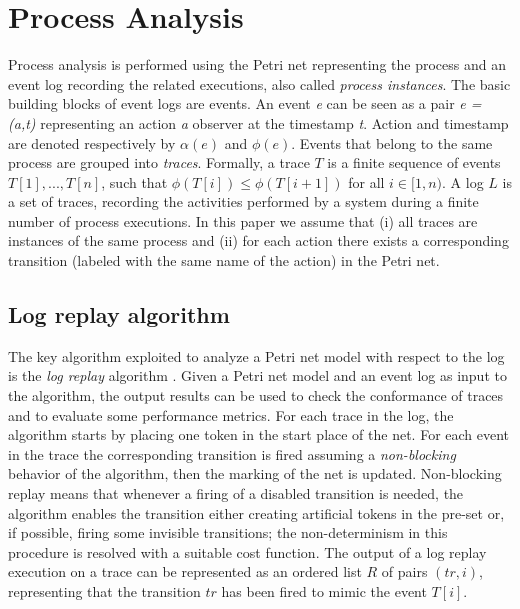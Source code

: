 \documentclass{llncs}
\begin{document}
\section{Process Analysis}\label{Background}

Process analysis is performed using the Petri net representing the
process and an event log recording the related executions, also called
\emph{process instances}. The basic building blocks of event logs are
events. An event {\itshape e} can be seen as a pair {\itshape e =
  (a,t) } representing an action {\itshape a } observer at the
timestamp {\itshape t}. Action and timestamp are denoted respectively
by $\alpha(e)$ and $\phi(e)$. Events that belong to the same process
are grouped into {\itshape traces}. Formally, a trace $T$ is a finite
sequence of events $T[1],..., T[n]$, such that $\phi(T[i]) \leq
\phi(T[i+1])$ for all  $i \in [1,n)$. A log $L$ is a set of traces,
recording the activities performed by a system during a finite number
of process executions. In this paper we assume that
(i) all traces are instances of the same process
and
(ii) for each action there exists a corresponding transition (labeled
with the same name of the action) in the Petri net.

\subsection{Log replay algorithm}\label{logreplayAlg}

The key algorithm exploited to analyze a Petri net model with respect to the log is the {\itshape log replay} algorithm \cite{13}\cite{3}\cite{4}. Given a Petri net model and an event log as input to the algorithm, the output results can be used to check the conformance of traces and to evaluate some performance metrics. For each trace in the log, the algorithm starts by placing one token in the start place of the net. For each event in the trace the corresponding transition is fired assuming a {\itshape non-blocking} behavior of the algorithm, then the marking of the net is updated. Non-blocking replay means that whenever a firing of a disabled transition is needed, the algorithm enables the transition either creating artificial tokens in the pre-set or, if possible, firing some invisible transitions; the non-determinism in this procedure is resolved with a suitable cost function. The output of a log replay execution on a trace can be represented as an ordered list $R$ of pairs $(tr, i)$, representing that the transition $tr$ has been fired to mimic the event $T[i]$.
\end{document}
